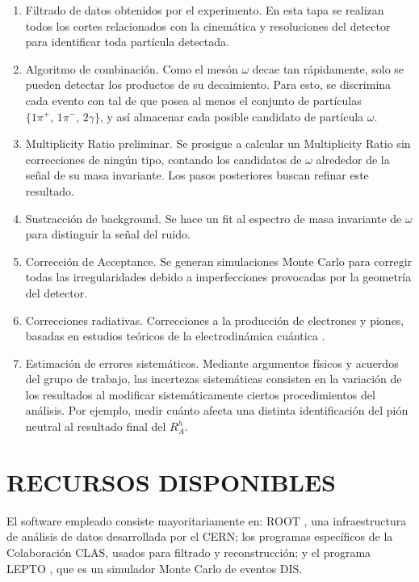 \begin{enumerate}
    \item Filtrado de datos obtenidos por el experimento. En esta tapa se realizan todos los cortes relacionados con la cinemática y resoluciones del detector para identificar toda partícula detectada.
    \item Algoritmo de combinación. Como el mesón $\omega$ decae tan rápidamente, solo se pueden detectar los productos de su decaimiento. Para esto, se discrimina cada evento con tal de que posea al menos el conjunto de partículas $\lbrace 1 \pi^+,\,1 \pi^-,\,2 \gamma \rbrace$, y así almacenar cada posible candidato de partícula $\omega$.
    \item Multiplicity Ratio preliminar. Se prosigue a calcular un Multiplicity Ratio sin correcciones de ningún tipo, contando los candidatos de $\omega$ alrededor de la señal de su masa invariante. Los pasos posteriores buscan refinar este resultado.
    \item Sustracción de background. Se hace un fit al espectro de masa invariante de $\omega$ para distinguir la señal del ruido.
    \item Corrección de Acceptance. Se generan simulaciones Monte Carlo para corregir todas las irregularidades debido a imperfecciones provocadas por la geometría del detector.
    \item Correcciones radiativas. Correcciones a la producción de electrones y piones, basadas en estudios teóricos de la electrodinámica cuántica \cite{rc1, rc2}.
    \item Estimación de errores sistemáticos. Mediante argumentos físicos y acuerdos del grupo de trabajo, las incertezas sistemáticas consisten en la variación de los resultados al modificar sistemáticamente ciertos procedimientos del análisis. Por ejemplo, medir cuánto afecta una distinta identificación del pión neutral al resultado final del $R^h_A$.
\end{enumerate}

\section{RECURSOS DISPONIBLES}

El software empleado consiste mayoritariamente en: ROOT \cite{root}, una infraestructura de análisis de datos desarrollada por el CERN; los programas específicos de la Colaboración CLAS, usados para filtrado y reconstrucción; y el programa LEPTO \cite{lepto}, que es un simulador Monte Carlo de eventos DIS.

